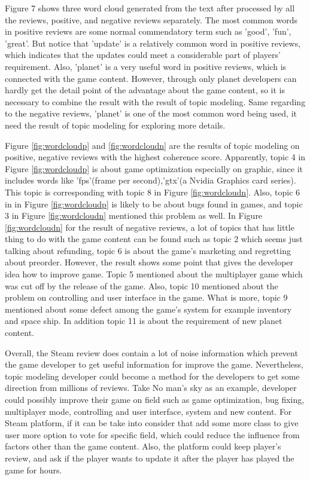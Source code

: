 \documentclass[12pt]{article}
\begin{document}
Figure 7 shows three word cloud generated from the text after processed by all the reviews, positive, and negative reviews separately. The most common words in positive reviews are some normal commendatory term such as 'good', 'fun', 'great'. But notice that 'update' is a relatively common word in positive reviews, which indicates that the updates could meet a considerable part of players' requirement. Also, 'planet' is a very useful word in positive reviews, which is connected with the game content. However, through only planet developers can hardly get the detail point of the advantage about the game content, so it is necessary to combine the result with the result of topic modeling. Same regarding to the negative reviews, 'planet' is one of the most common word being used, it need the result of topic modeling for exploring more details. 

Figure \ref{fig:wordcloudp} and \ref{fig:wordcloudn} are the results of topic modeling on positive, negative reviews with the highest coherence score. Apparently, topic 4 in Figure \ref{fig:wordcloudp} is about game optimization especially on graphic, since it includes words like 'fps'(frame per second),'gtx'(a Nvidia Graphics card series). This topic is corresponding with topic 8 in Figure \ref{fig:wordcloudn}. Also, topic 6 in in Figure \ref{fig:wordcloudp} is likely to be about bugs found in games, and topic 3 in Figure \ref{fig:wordcloudn} mentioned this problem as well. In Figure \ref{fig:wordcloudn} for the result of negative reviews, a lot of topics that has little thing to do with the game content can be found such as topic 2 which seems just talking about refunding, topic 6 is about the game's marketing and regretting about preorder. However, the result shows some point that gives the developer idea how to improve game. Topic 5 mentioned about the multiplayer game which was cut off by the release of the game. Also, topic 10 mentioned about the problem on controlling and user interface in the game. What is more, topic 9 mentioned about some defect among the game's system for example inventory and space ship. In addition topic 11 is about the requirement of new planet content.

Overall, the Steam review does contain a lot of noise information which prevent the game developer to get useful information for improve the game. Nevertheless, topic modeling developer could become a method for the developers to get some direction from millions of reviews. Take No man's sky as an example, developer could possibly improve their game on field such as game optimization, bug fixing, multiplayer mode, controlling and user interface, system and new content. For Steam platform, if it can be take into consider that add some more class to give user more option to vote for specific field, which could reduce the influence from factors other than the game content. Also, the platform could keep player's review, and ask if the player wants to update it after the player has played the game for hours.
\end{document}

